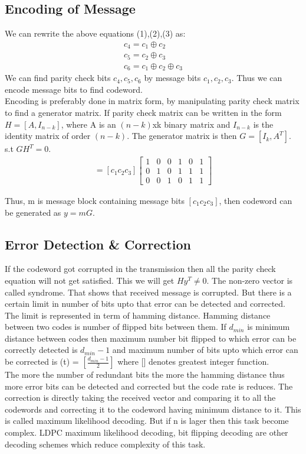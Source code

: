 \subsection{Encoding of Message}
We can rewrite the above equations (1),(2),(3) as:
\begin{align}
c_4 = c_1 \oplus c_2 \\
c_5 = c_2 \oplus c_3 \\
c_6 = c_1 \oplus c_2 \oplus c_3  
\end{align}  
We can find parity check bits $c_4,c_5,c_6$ by message bits $c_1,c_2,c_3$.
Thus we can encode message bits to find codeword. \\
Encoding is preferably done in matrix form, by manipulating parity check matrix to find a generator matrix.
If parity check matrix can be written in the form
$H = [A, I_{n- k} ]$,
where A is an $(n-k)$xk binary matrix and $I_{n-k}$ is the identity matrix of order
$(n-k)$. The generator matrix is then
$G = [I_k , A^T ]$.
s.t $GH^T = 0$. \\
\begin{align}
[c_1 c_2 ... c_6]=[c_1 c_2 c_3] \left[ \begin{array}{cccccc}
1 & 0 & 0 & 1 & 0 & 1\\
0 & 1 & 0 & 1 & 1 & 1\\
0 & 0 & 1 & 0 & 1 & 1  
\end{array} \right]
\end{align}
 

Thus, m is message block containing message bits $[c_1 c_2 c_3]$, then codeword can be generated as $y=mG$.

\subsection{Error Detection \& Correction}

If the codeword got corrupted in the transmission then all the parity check equation will not get satisfied. This we will get $Hy^T\neq0$. The non-zero vector is called syndrome. That shows that received message is corrupted. But there is a certain limit in number of bits upto that error can be detected and corrected.
The limit is represented in term of hamming distance. Hamming distance between two codes is number of flipped bits between them. If $d_{min}$ is minimum distance between codes then maximum number bit flipped to which error can be correctly detected is $d_{min}-1$ and maximum number of bits upto which error can be corrected is
(t) = $[\frac{d_{min}-1}{2}]$
where [] denotes greatest integer function.\\
The more the number of redundant bits the more the hamming distance thus more error bits can be detected and corrected but the code rate is reduces. The correction is directly taking the received vector and comparing it to all the codewords and correcting it to the codeword having minimum distance to it. This is called maximum likelihood decoding. But if n is lager then this task become complex. LDPC maximum likelihood decoding, bit flipping decoding are other decoding schemes which reduce complexity of this task.








